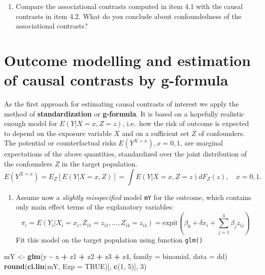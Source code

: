 \documentclass[
]{book}
\newenvironment{Shaded}{\begin{snugshade}}{\end{snugshade}}
\newcommand{\AttributeTok}[1]{\textcolor[rgb]{0.13,0.29,0.53}{#1}}
\newcommand{\ConstantTok}[1]{\textcolor[rgb]{0.56,0.35,0.01}{#1}}
\newcommand{\DecValTok}[1]{\textcolor[rgb]{0.00,0.00,0.81}{#1}}
\newcommand{\FunctionTok}[1]{\textcolor[rgb]{0.13,0.29,0.53}{\textbf{#1}}}
\newcommand{\NormalTok}[1]{#1}
\newcommand{\OtherTok}[1]{\textcolor[rgb]{0.56,0.35,0.01}{#1}}
\newcommand{\SpecialCharTok}[1]{\textcolor[rgb]{0.81,0.36,0.00}{\textbf{#1}}}
\providecommand{\tightlist}{%
  \setlength{\itemsep}{0pt}\setlength{\parskip}{0pt}}
\begin{document}
\begin{enumerate}
\def\labelenumi{\arabic{enumi}.}
\setcounter{enumi}{2}
\tightlist
\item
  Compare the associational contrasts computed in
  item 4.1 with the
  causal contrasts in item 4.2. What do you conclude about
  confoundedness of the associational contrasts?
\end{enumerate}

\section{Outcome modelling and estimation of causal contrasts by g-formula}\label{outcome-modelling-and-estimation-of-causal-contrasts-by-g-formula}

As the first approach for estimating causal contrasts of interest
we apply the method of \textbf{standardization} or \textbf{g-formula}.
It is based on a hopefully realistic enough model for
\(E(Y|X=x, Z=z)\), i.e.~how the risk
of outcome is expected to depend on the exposure variable
\(X\) and on a
sufficient set \(Z\) of confounders. The potential
or counterfactual risks
\(E(Y^{X=x}), x=0,1\), are marginal expectations of the above
quantities, standardized over the joint distribution of the confounders \(Z\) in the
target population.
\[ E(Y^{X=x}) = E_Z[E(Y|X=x,Z)]
       = \int E(Y|X=x, Z=z)dF_Z(z), \quad x=0,1. \]

\begin{enumerate}
\def\labelenumi{\arabic{enumi}.}
\tightlist
\item
  Assume now a \emph{slightly misspecified} model \texttt{mY}
  for the outcome, which contains only main effect terms
  of the explanatory variables:
  \[ \pi_i = E(Y_i|X_i=x_i, Z_{i1}=z_{i1}, \dots, Z_{i4}=z_{i4}) =
    \text{expit}\left(\beta_0 + \delta x_i +
    \sum_{j=1}^4 \beta_j z_{ij} \right) \]
  Fit this model on the
  target population using function \texttt{glm()}
\end{enumerate}

\begin{Shaded}
\begin{Highlighting}[]
\NormalTok{mY }\OtherTok{\textless{}{-}} \FunctionTok{glm}\NormalTok{(y }\SpecialCharTok{\textasciitilde{}}\NormalTok{ x }\SpecialCharTok{+}\NormalTok{ z1 }\SpecialCharTok{+}\NormalTok{ z2 }\SpecialCharTok{+}\NormalTok{ z3 }\SpecialCharTok{+}\NormalTok{ z4, }\AttributeTok{family =}\NormalTok{ binomial, }\AttributeTok{data =}\NormalTok{ dd)}
\FunctionTok{round}\NormalTok{(}\FunctionTok{ci.lin}\NormalTok{(mY, }\AttributeTok{Exp =} \ConstantTok{TRUE}\NormalTok{)[, }\FunctionTok{c}\NormalTok{(}\DecValTok{1}\NormalTok{, }\DecValTok{5}\NormalTok{)], }\DecValTok{3}\NormalTok{)}
\end{Highlighting}
\end{Shaded}
\end{document}
